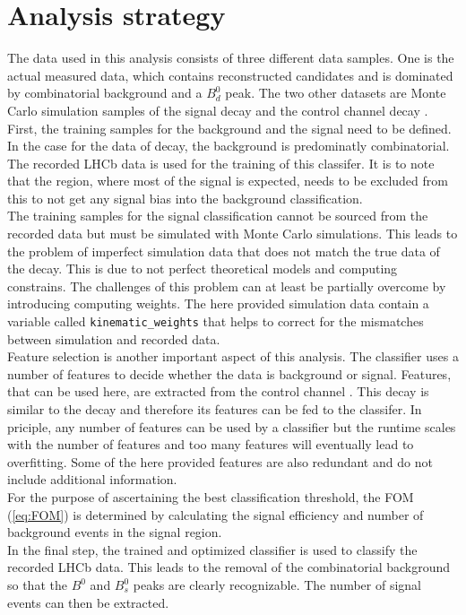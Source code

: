 \section{Analysis strategy}
\label{sec:strategy}
The data used in this analysis consists of three different data samples. One is the actual measured data, which contains reconstructed \printBtoPsiKs \: candidates
and is dominated by combinatorial background and a $B^0_d$ peak. The two other datasets are Monte Carlo simulation samples of the signal decay \printBstoPsiKs \: 
and the control channel decay \printBdtoPsiKs. \\
First, the training samples for the background and the signal need to be defined. In the case for the data of \printBdtoPsiKs \: decay, the background is predominatly combinatorial. The recorded LHCb 
data is used for the training of this classifer. It is to note that the region, where most of the signal is expected, needs to be excluded from this to not get any signal bias into the background classification. \\
The training samples for the signal classification cannot be sourced from the recorded data but must be simulated with Monte Carlo simulations. This leads to the problem of imperfect simulation data 
that does not match the true data of the decay. This is due to not perfect theoretical models and computing constrains. The challenges of this problem can at least be partially overcome by introducing 
computing weights. The here provided simulation data contain a variable called \texttt{kinematic\_weights} that helps to correct for the mismatches between simulation and recorded data. \\
Feature selection is another important aspect of this analysis. The classifier uses a number of features to decide whether the data is background or signal. Features, that can be used here, are extracted
from the control channel \printBtoPsiKs. This decay is similar to the decay \printBstoPsiKs \: and therefore its features can be fed to the classifer.
In priciple, any number of features can be used by a classifier but the runtime scales with the number of features and too many features will eventually lead to overfitting. Some of the here provided features
are also redundant and do not include additional information. \\
For the purpose of ascertaining the best classification threshold, the FOM (\autoref{eq:FOM}) is determined by calculating the signal efficiency and number of background events
in the signal region. \\
In the final step, the trained and optimized classifier is used to classify the recorded LHCb data. This leads to the removal of the combinatorial background so that the $B^0$ and $B^0_s$ peaks are clearly
recognizable. The number of signal events can then be extracted. 

